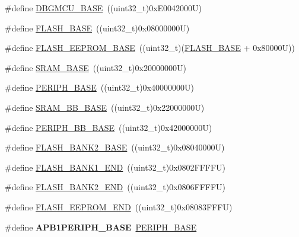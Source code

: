 \begin{DoxyCompactItemize}
\item 
\#define \hyperlink{group___peripheral__memory__map_ga4adaf4fd82ccc3a538f1f27a70cdbbef}{D\-B\-G\-M\-C\-U\-\_\-\-B\-A\-S\-E}~((uint32\-\_\-t)0x\-E0042000\-U)
\item 
\#define \hyperlink{group___peripheral__memory__map_ga23a9099a5f8fc9c6e253c0eecb2be8db}{F\-L\-A\-S\-H\-\_\-\-B\-A\-S\-E}~((uint32\-\_\-t)0x08000000\-U)
\item 
\#define \hyperlink{group___peripheral__memory__map_ga45b9071c81cb72a66e2e3195343fcb3a}{F\-L\-A\-S\-H\-\_\-\-E\-E\-P\-R\-O\-M\-\_\-\-B\-A\-S\-E}~((uint32\-\_\-t)(\hyperlink{group___peripheral__memory__map_ga23a9099a5f8fc9c6e253c0eecb2be8db}{F\-L\-A\-S\-H\-\_\-\-B\-A\-S\-E} + 0x80000\-U))
\item 
\#define \hyperlink{group___peripheral__memory__map_ga05e8f3d2e5868754a7cd88614955aecc}{S\-R\-A\-M\-\_\-\-B\-A\-S\-E}~((uint32\-\_\-t)0x20000000\-U)
\item 
\#define \hyperlink{group___peripheral__memory__map_ga9171f49478fa86d932f89e78e73b88b0}{P\-E\-R\-I\-P\-H\-\_\-\-B\-A\-S\-E}~((uint32\-\_\-t)0x40000000\-U)
\item 
\#define \hyperlink{group___peripheral__memory__map_gad3548b6e2f017f39d399358f3ac98454}{S\-R\-A\-M\-\_\-\-B\-B\-\_\-\-B\-A\-S\-E}~((uint32\-\_\-t)0x22000000\-U)
\item 
\#define \hyperlink{group___peripheral__memory__map_gaed7efc100877000845c236ccdc9e144a}{P\-E\-R\-I\-P\-H\-\_\-\-B\-B\-\_\-\-B\-A\-S\-E}~((uint32\-\_\-t)0x42000000\-U)
\item 
\#define \hyperlink{group___peripheral__memory__map_ga289057b052162696849fef25b656d3d9}{F\-L\-A\-S\-H\-\_\-\-B\-A\-N\-K2\-\_\-\-B\-A\-S\-E}~((uint32\-\_\-t)0x08040000\-U)
\item 
\#define \hyperlink{group___peripheral__memory__map_ga443a2786535d83e32dfdc2b29e379332}{F\-L\-A\-S\-H\-\_\-\-B\-A\-N\-K1\-\_\-\-E\-N\-D}~((uint32\-\_\-t)0x0802\-F\-F\-F\-F\-U)
\item 
\#define \hyperlink{group___peripheral__memory__map_gab24a21b645aaab8737af5603c3d11e71}{F\-L\-A\-S\-H\-\_\-\-B\-A\-N\-K2\-\_\-\-E\-N\-D}~((uint32\-\_\-t)0x0806\-F\-F\-F\-F\-U)
\item 
\#define \hyperlink{group___peripheral__memory__map_gac8cb9b66893a7c4bdff3258909af027a}{F\-L\-A\-S\-H\-\_\-\-E\-E\-P\-R\-O\-M\-\_\-\-E\-N\-D}~((uint32\-\_\-t)0x08083\-F\-F\-F\-U)
\item 
\hypertarget{group___peripheral__memory__map_ga45666d911f39addd4c8c0a0ac3388cfb}{\#define {\bfseries A\-P\-B1\-P\-E\-R\-I\-P\-H\-\_\-\-B\-A\-S\-E}~\hyperlink{group___peripheral__memory__map_ga9171f49478fa86d932f89e78e73b88b0}{P\-E\-R\-I\-P\-H\-\_\-\-B\-A\-S\-E}}\label{group___peripheral__memory__map_ga45666d911f39addd4c8c0a0ac3388cfb}


\end{DoxyCompactItemize}

